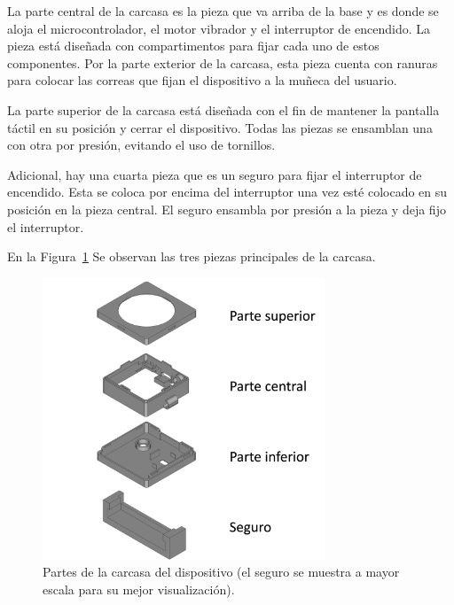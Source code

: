 \documentclass[
  12pt,
  letterpaper,
  DIV=11,
  numbers=noendperiod]{scrreport}
\begin{document}
La parte central de la carcasa es la pieza que va arriba de la base y es
donde se aloja el microcontrolador, el motor vibrador y el interruptor
de encendido. La pieza está diseñada con compartimentos para fijar cada
uno de estos componentes. Por la parte exterior de la carcasa, esta
pieza cuenta con ranuras para colocar las correas que fijan el
dispositivo a la muñeca del usuario.

La parte superior de la carcasa está diseñada con el fin de mantener la
pantalla táctil en su posición y cerrar el dispositivo. Todas las piezas
se ensamblan una con otra por presión, evitando el uso de tornillos.

Adicional, hay una cuarta pieza que es un seguro para fijar el
interruptor de encendido. Esta se coloca por encima del interruptor una
vez esté colocado en su posición en la pieza central. El seguro ensambla
por presión a la pieza y deja fijo el interruptor.

En la Figura~\ref{fig-partescase} Se observan las tres piezas
principales de la carcasa.

\begin{figure}

{\centering \includegraphics[width=0.75\textwidth,height=\textheight]{Capitulos/../Imagenes/PartesCase.png}

}

\caption{\label{fig-partescase}Partes de la carcasa del dispositivo (el
seguro se muestra a mayor escala para su mejor visualización).}

\end{figure}
\end{document}
